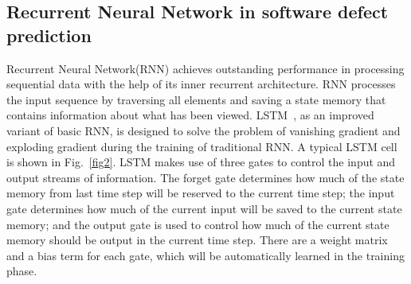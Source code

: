 \documentclass[journal]{IEEEtran}
\begin{document}
\subsection{Recurrent Neural Network in software defect prediction}

Recurrent Neural Network(RNN) achieves outstanding performance in processing sequential data with the help of its inner recurrent architecture. RNN processes the input sequence by traversing all elements and saving a state memory that contains information about what has been viewed. LSTM~\cite{hochreiter1997long}, as an improved variant of basic RNN, is designed to solve the problem of vanishing gradient and exploding gradient during the training of traditional RNN. A typical LSTM cell is shown in Fig.~\ref{fig2}. LSTM makes use of three gates to control the input and output streams of information. The forget gate determines how much of the state memory from last time step will be reserved to the current time step; the input gate determines how much of the current input will be saved to the current state memory; and the output gate is used to control how much of the current state memory should be output in the current time step. There are a weight matrix and a bias term for each gate, which will be automatically learned in the training phase.
\end{document}
